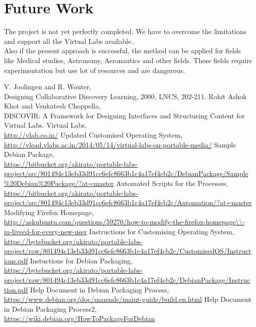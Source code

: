 \documentclass[conference]{IEEEtran}
\begin{document}
\section{Future Work}
  The project is not yet perfectly completed. We have to overcome the limitations and support all the Virtual Labs available.\cite{vlab}. \\
  Also if the present approach is successful, the method can be applied for fields like Medical studies, Astronomy, Aeronautics and other fields. These fields require experimentation but use lot of resources and are dangerous.\\    
\begin{thebibliography}{10}
   V. Joolingen and R. Wouter,\\ {Designing Collaborative Discovery Learning, 2000, LNCS, 202-211.}
   Rohit Ashok Khot and Venkatesh Choppella,\\ {DISCOVIR: A Framework for Designing Interfaces and Structuring Content for Virtual Labs.}
  Virtual Labs,\\{\url{http://vlab.co.in/}}  
  Updated Customised Operating System,\\ {\url{http://vlead.vlabs.ac.in/2014/05/14/virtual-labs-on-portable-media/}}
  Sample Debian Package,\\ {\url{https://bitbucket.org/akirato/portable-labs-project/src/801494c13eb33d91cc6efc8663b1c4a17ef4cb2c/DebianPackage/Sample%20Debian%20Package/?at=master}}
  Automated Scripts for the Processes,\\ {\url{https://bitbucket.org/akirato/portable-labs-project/src/801494c13eb33d91cc6efc8663b1c4a17ef4cb2c/Automation/?at=master}}
  Modifying Firefox Homepage,\\ {\url{http://askubuntu.com/questions/59270/how-to-modify-the-firefox-homepage\\-in-livecd-for-every-new-user}}
  Instructions for Customising Operating System,\\ {\url{https://bytebucket.org/akirato/portable-labs-project/raw/801494c13eb33d91cc6efc8663b1c4a17ef4cb2c/CustomisedOS/Instructions.pdf}}
  Instuctions for Debian Packaging,\\ {\url{https://bytebucket.org/akirato/portable-labs-project/raw/801494c13eb33d91cc6efc8663b1c4a17ef4cb2c/DebianPackage/Instruction.pdf}}
  Help Document in Debian Packaging Process,\\{\url{https://www.debian.org/doc/manuals/maint-guide/build.en.html}}
  Help Document in Debian Packaging Process2,\\{\url{https://wiki.debian.org/HowToPackageForDebian}} 
  
\end{thebibliography}     
\end{document}
